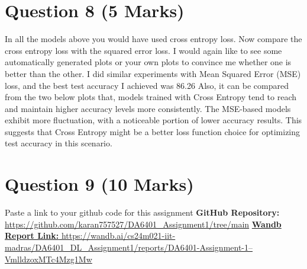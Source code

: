 \documentclass{article}
\begin{document}
{{\section{Question 8 (5 Marks)}
In all the models above you would have used cross entropy loss. Now compare the cross entropy loss with the squared error loss. I would again like to see some automatically generated plots or your own plots to convince me whether one is better than the other.
I did similar experiments with Mean Squared Error (MSE) loss, and the best test accuracy I achieved was 86.26%
Also, it can be compared from the two below plots that, models trained with Cross Entropy tend to reach and maintain higher accuracy levels more consistently. The MSE-based models exhibit more fluctuation, with a noticeable portion of lower accuracy results. This suggests that Cross Entropy might be a better loss function choice for optimizing test accuracy in this scenario.
\section{Question 9 (10 Marks)}
Paste a link to your github code for this assignment
\textbf{GitHub Repository: }\href{https://github.com/karan757527/DA6401_Assignment1/tree/main}{https://github.com/karan757527/DA6401_Assignment1/tree/main}
\href{https://api.wandb.ai/links/cs24m021-iit-madras/9kmya6xn}{\textbf{Wandb Report Link: }https://wandb.ai/cs24m021-iit-madras/DA6401_DL_Assignment1/reports/DA6401-Assignment-1--VmlldzoxMTc4Mzg1Mw}
}}
\end{document}
